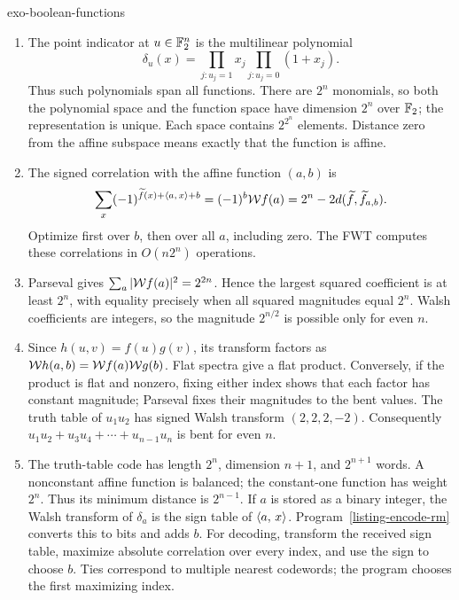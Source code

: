 \begin{correction}{exo-boolean-functions}
\begin{enumerate}
\item The point indicator at $u\in\mathbb{F}_2^n$ is the multilinear polynomial
\[
 \delta_u(x)=\prod_{j:u_j=1}x_j\prod_{j:u_j=0}(1+x_j).
\]
Thus such polynomials span all functions. There are $2^n$ monomials,
so both the polynomial space and the function space have dimension
$2^n$ over $\mathbb{F}_2$; the representation is unique. Each space contains
$2^{2^n}$ elements. Distance zero from the affine subspace means exactly
that the function is affine.
\item The signed correlation with the affine function $(a,b)$ is
\[
 \sum_x(-1)^{\widetilde f(x)+\langle a,\,x\rangle+b}
    =(-1)^b\mathcal{W} f(a)=2^n-2d(\widetilde f,\widetilde f_{a,b}).
\]
Optimize first over $b$, then over all $a$, including zero. The FWT
computes these correlations in $O(n2^n)$ operations.
\item Parseval gives $\sum_a|\mathcal{W} f(a)|^2=2^{2n}$. Hence the largest
squared coefficient is at least $2^n$, with equality precisely when
all squared magnitudes equal $2^n$. Walsh coefficients are integers,
so the magnitude $2^{n/2}$ is possible only for even $n$.
\item Since $h(u,v)=f(u)g(v)$, its transform factors as
$\mathcal{W} h(a,b)=\mathcal{W} f(a)\mathcal{W} g(b)$. Flat spectra give a flat product.
Conversely, if the product is flat and nonzero, fixing either index
shows that each factor has constant magnitude; Parseval fixes their
magnitudes to the bent values. The truth table of $u_1u_2$ has signed
Walsh transform $(2,2,2,-2)$. Consequently
$u_1u_2+u_3u_4+\cdots+u_{n-1}u_n$ is bent for even $n$.
\item The truth-table code has length $2^n$, dimension $n+1$, and
$2^{n+1}$ words. A nonconstant affine function is balanced; the
constant-one function has weight $2^n$. Thus its minimum distance is
$2^{n-1}$. If $a$ is stored as a binary integer, the Walsh transform of
$\delta_a$ is the sign table of $\langle a,\,x\rangle$. Program~\ref{listing-encode-rm}
converts this to bits and adds $b$. For decoding, transform the received
sign table, maximize absolute correlation over every index, and use the
sign to choose $b$. Ties correspond to multiple nearest codewords;
the program chooses the first maximizing index.
\begin{listing}[H]

\caption{Encoding a first-order Reed--Muller word.}
\label{listing-encode-rm}
\end{listing}
\begin{listing}[H]

\caption{Nearest-word Reed--Muller decoding by Walsh correlation.}
\label{listing-decode-rm}
\end{listing}
\end{enumerate}
\end{correction}

